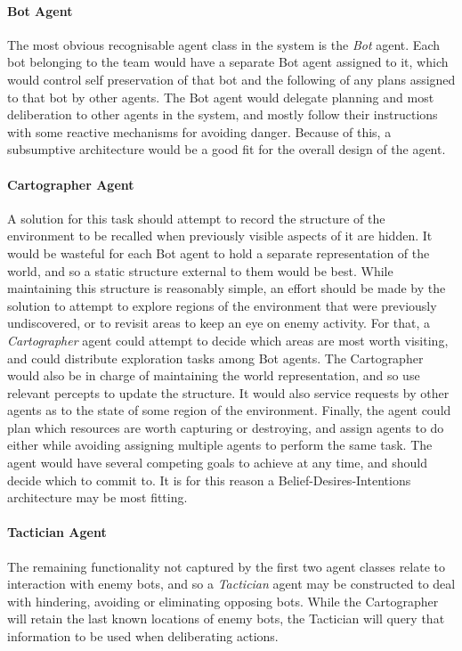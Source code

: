 \documentclass[a4paper,10pt]{article}
\begin{document}
\paragraph{Bot Agent}
The most obvious recognisable agent class in the system is the \emph{Bot} agent. Each bot belonging to the team would have a separate Bot agent assigned to it, which would control self preservation of that bot and the following of any plans assigned to that bot by other agents. The Bot agent would delegate planning and most deliberation to other agents in the system, and mostly follow their instructions with some reactive mechanisms for avoiding danger. Because of this, a subsumptive architecture\cite{brooks90} would be a good fit for the overall design of the agent.

\paragraph{Cartographer Agent}
A solution for this task should attempt to record the structure of the environment to be recalled when previously visible aspects of it are hidden. It would be wasteful for each Bot agent to hold a separate representation of the world, and so a static structure external to them would be best. While maintaining this structure is reasonably simple, an effort should be made by the solution to attempt to explore regions of the environment that were previously undiscovered, or to revisit areas to keep an eye on enemy activity. For that, a \emph{Cartographer} agent could attempt to decide which areas are most worth visiting, and could distribute exploration tasks among Bot agents. The Cartographer would also be in charge of maintaining the world representation, and so use relevant percepts to update the structure. It would also service requests by other agents as to the state of some region of the environment. Finally, the agent could plan which resources are worth capturing or destroying, and assign agents to do either while avoiding assigning multiple agents to perform the same task. The agent would have several competing goals to achieve at any time, and should decide which to commit to. It is for this reason a Belief-Desires-Intentions architecture may be most fitting.

\paragraph{Tactician Agent}
The remaining functionality not captured by the first two agent classes relate to interaction with enemy bots, and so a \emph{Tactician} agent may be constructed to deal with hindering, avoiding or eliminating opposing bots. While the Cartographer will retain the last known locations of enemy bots, the Tactician will query that information to be used when deliberating actions. 
\end{document}
